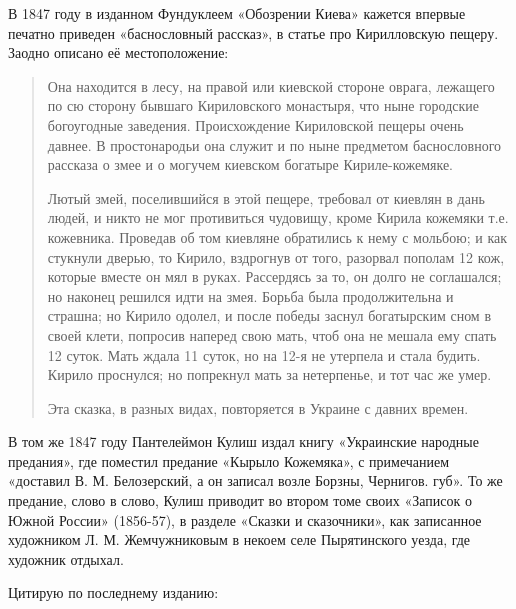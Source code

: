 В 1847 году в изданном Фундуклеем «Обозрении Киева» кажется впервые печатно приведен «баснословный рассказ», в статье про Кирилловскую пещеру. Заодно описано её местоположение:

\begin{quotation}
Она находится в лесу, на правой или киевской стороне оврага, лежащего по сю сторону бывшаго Кириловского монастыря, что ныне городские богоугодные заведения. Происхождение Кириловской пещеры очень давнее. В простонародьи она служит и по ныне предметом баснословного рассказа о змее и о могучем киевском богатыре Кириле-кожемяке. 

Лютый змей, поселившийся в этой пещере, требовал от киевлян в дань людей, и никто не мог противиться чудовищу, кроме Кирила кожемяки т.е. кожевника. Проведав об том киевляне обратились к нему с мольбою; и как стукнули дверью, то Кирило, вздрогнув от того, разорвал пополам 12 кож, которые вместе он мял в руках. Рассердясь за то, он долго не соглашался; но наконец решился идти на змея. Борьба была продолжительна и страшна; но Кирило одолел, и после победы заснул богатырским сном в своей клети, попросив наперед свою мать, чтоб она не мешала ему спать 12 суток. Мать ждала 11 суток, но на 12-я не утерпела и стала будить. Кирило проснулся; но попрекнул мать за нетерпенье, и тот час же умер. 

Эта сказка, в разных видах, повторяется в Украине с давних времен.
\end{quotation}

В том же 1847 году Пантелеймон Кулиш издал книгу «Украинские народные предания», где поместил предание «Кырыло Кожемяка», с примечанием «доставил В. М. Белозерский, а он записал возле Борзны, Чернигов. губ». То же предание, слово в слово, Кулиш приводит во втором томе своих «Записок о Южной России» (1856-57), в разделе «Сказки и сказочники», как записанное художником Л. М. Жемчужниковым в некоем селе Пырятинского уезда, где художник отдыхал.

Цитирую по последнему изданию:


